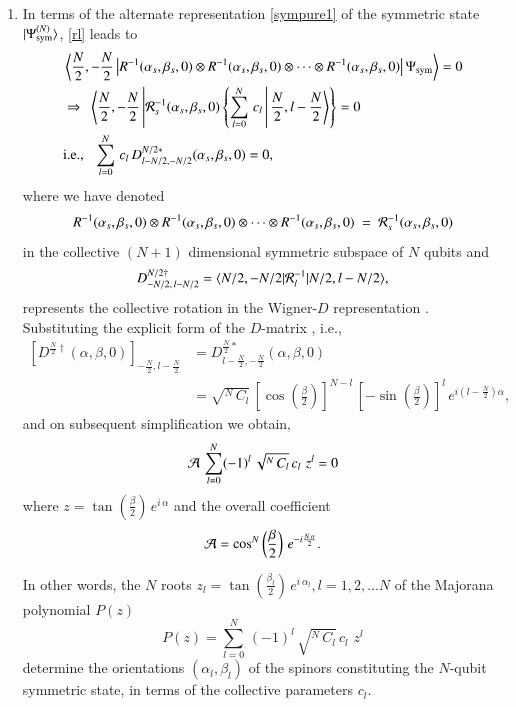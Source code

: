 \begin{enumerate}
\item In terms of the alternate representation \eqref{sympure1} of the symmetric state $\vert \Psi^{(N)}_{\rm sym}\rangle$, \eqref{rl} leads to 
{\fontsize{8pt}{10pt}\selectfont
\begin{align}
&\left\langle \frac{N}{2},-\frac{N}{2}\left\vert R^{-1}(\alpha_s,\beta_s,0)\otimes R^{-1}(\alpha_s,\beta_s,0)\otimes \cdots  \otimes R^{-1}(\alpha_s,\beta_s,0) \right \vert \Psi_{\rm sym}\right\rangle=0\nonumber \\ 
&\Rightarrow\ \ \left\langle \frac{N}{2},-\frac{N}{2}\left \vert {\cal R}_s^{-1}(\alpha_s,\beta_s,0) \left\{\sum_{l=0}^N\, c_l\, \right \vert \frac{N}{2},l-\frac{N}{2}\right \rangle\right\}=0 \nonumber \\
&{\rm i.e.,} \ \ \ \sum_{l=0}^N\, c_l\, D^{N/2*}_{l-N/2,-N/2}(\alpha_s,\beta_s,0) =0, \label{prelim}
\end{align}}\relax
where we have denoted 
$$R^{-1}(\alpha_s,\beta_s,0)\otimes R^{-1}(\alpha_s,\beta_s,0)\otimes \cdots  \otimes R^{-1}(\alpha_s,\beta_s,0)~=~{\cal R}^{-1}_s(\alpha_s,\beta_s,0)$$ 
in the collective $(N+1)$ dimensional symmetric subspace of $N$ qubits and 
$$
D^{N/2\dag}_{-N/2,\, l-N/2}=\langle N/2,-N/2\vert{\cal R}^{-1}_l \vert N/2,l-N/2\rangle,
$$
represents the collective rotation in the Wigner-$D$ representation \cite{Rose}. Substituting the explicit form of the $D$-matrix \cite{Rose}, i.e.,
{\fontsize{9pt}{11pt}\selectfont
\begin{align}
\left[D^{\frac{N}{2}\dag}(\alpha,\beta,0)\right]_{-\frac{N}{2},l-\frac{N}{2}}&= D^{\frac{N}{2}*}_{l-\frac{N}{2},-\frac{N}{2}}(\alpha,\beta,0) \nonumber\\ 
&=  \sqrt{^N\,C_l}\, \left[\cos\left(\frac{\beta}{2}\right)\right]^{N-l}\, \left[-\sin\left(\frac{\beta}{2}\right)\right]^{l} \, e^{i(l-\frac{N}{2})\alpha},\label{dmatrix}
\end{align}}\relax
and on subsequent simplification we obtain,
\begin{equation}
{\cal A}\, \sum_{l=0}^N (-1)^l\,\sqrt{^N\, C_l}\,  c_l\,  \, z^{l}=0  \label{cmj02}
\end{equation} 
where $z=\tan\left(\frac{\beta}{2}\right)\,e^{i\, \alpha}$ and the overall coefficient 
$${\cal A}=\cos^N\left(\frac{\beta}{2}\right)\,e^{-i\frac{N\,\alpha}{2}}.$$ 

In other words, the $N$ roots $z_l=\tan\left(\frac{\beta_l}{2}\right)\,e^{i\, \alpha_l}, l=1,2,\ldots N$ of the Majorana polynomial $P(z)$
\begin{equation} 
P(z)=\sum_{l=0}^N\, (-1)^l\, \sqrt{^N\, C_l}\,  c_l\,  \, z^{l}\label{Mp}
\end{equation}
determine the orientations $(\alpha_l,\beta_l)$ of the  spinors constituting the  $N$-qubit symmetric state, in terms of the collective parameters $c_l$.
\end{enumerate}

